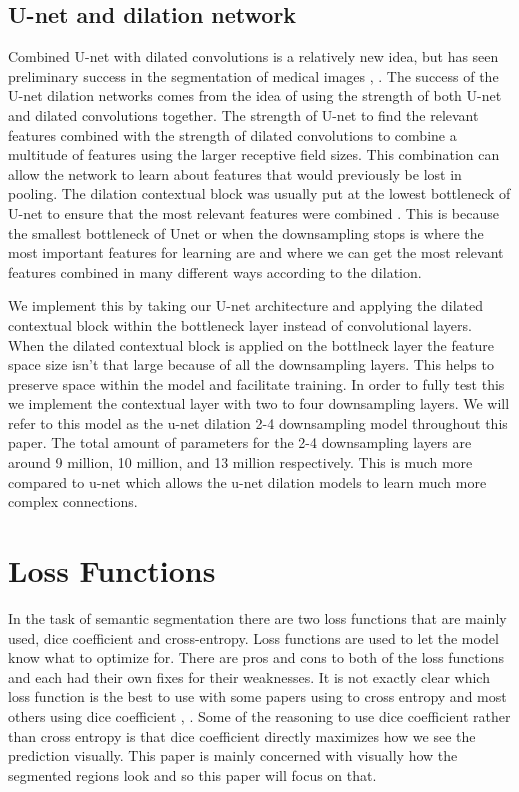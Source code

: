 \subsection{U-net and dilation network}
Combined U-net with dilated convolutions is a relatively new idea, but has seen preliminary success in the segmentation of medical images \cite{10.1007/978-3-030-01449-0_16dilatedunet}, \cite{DBLP:journals/corr/abs-1805-10720}. 
The success of the U-net dilation networks comes from the idea of using the strength of both U-net and dilated convolutions together. 
The strength of U-net to find the relevant features combined with the strength of dilated convolutions to combine a multitude of features using the larger receptive field sizes. 
This combination can allow the network to learn about features that would previously be lost in pooling. 
The dilation contextual block was usually put at the lowest bottleneck of U-net to ensure that the most relevant features were combined \cite{10.1007/978-3-030-01449-0_16dilatedunet}. 
This is because the smallest bottleneck of Unet or when the downsampling stops is where the most important features for learning are and where we can get the most relevant features combined in many different ways according to the dilation. 
    
We implement this by taking our U-net architecture and applying the dilated contextual block within the bottleneck layer instead of convolutional layers. 
When the dilated contextual block is applied on the bottlneck layer the feature space size isn't that large because of all the downsampling layers. 
This helps to preserve space within the model and facilitate training.
In order to fully test this we implement the contextual layer with two to four downsampling layers.
We will refer to this model as the u-net dilation 2-4 downsampling model throughout this paper. 
The total amount of parameters for the 2-4 downsampling layers are around 9 million, 10 million, and 13 million respectively. 
This is much more compared to u-net which allows the u-net dilation models to learn much more complex connections. 
    
    
\section{Loss Functions}
    In the task of semantic segmentation there are two loss functions that are mainly used, dice coefficient and cross-entropy. 
    Loss functions are used to let the model know what to optimize for.
    There are pros and cons to both of the loss functions and each had their own fixes for their weaknesses. 
    It is not exactly clear which loss function is the best to use with some papers using to cross entropy \cite{DBLP:journals/corr/ChenPK0Y16} and most others using dice coefficient \cite{10.1007/978-3-030-01449-0_16dilatedunet}, \cite{DBLP:journals/corr/abs-1805-10720}. Some of the reasoning to use dice coefficient rather than cross entropy is that dice coefficient directly maximizes how we see the prediction visually. 
    This paper is mainly concerned with visually how the segmented regions look and so this paper will focus on that.
    
